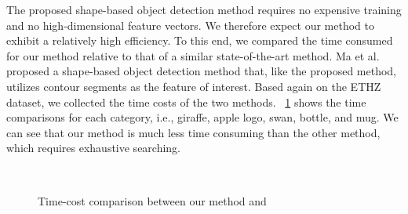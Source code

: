 \documentclass[journal]{IEEEtran}
\begin{document}
The proposed shape-based object detection method requires no expensive training and no high-dimensional feature vectors. We therefore expect our method to exhibit a relatively high efficiency. 
To this end, we compared the time consumed for our method relative to that of a similar state-of-the-art method. 
Ma et al. \cite{ma2011} proposed a shape-based object detection method that, 
like the proposed method, utilizes contour segments as the feature of interest. 
Based again on the ETHZ dataset, we collected the time costs of the two methods.
\figurename~\ref{fig:22} shows the time comparisons for each category, 
i.e., giraffe, apple logo, swan, bottle, and mug. 
We can see that our method is much less time consuming than the other method, 
which requires exhaustive searching.

\begin{figure}[!t]
\centering
{}\hfil%
\hfil%
\\%
\hfil%
%
\caption{Time-cost comparison between our method and \cite{ma2011}}
\label{fig:22}
\end{figure}
\end{document}
